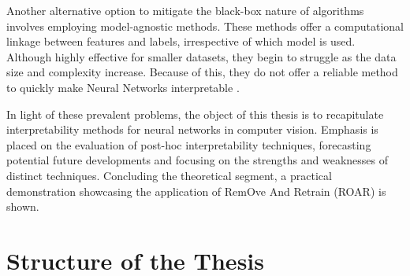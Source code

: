 Another alternative option to mitigate the black-box nature of algorithms involves employing model-agnostic methods. These methods offer a computational linkage between features and labels, irrespective of which model is used. Although highly effective for smaller datasets, they begin to struggle as the data size and complexity increase. Because of this, they do not offer a reliable method to quickly make Neural Networks interpretable \cite{molnar2022}.

In light of these prevalent problems, the object of this thesis is to recapitulate interpretability methods for neural networks in computer vision. Emphasis is placed on the evaluation of post-hoc interpretability techniques, forecasting potential future developments and focusing on the strengths and weaknesses of distinct techniques. Concluding the theoretical segment, a practical demonstration showcasing the application of RemOve And Retrain (ROAR)\cite{hooker2019benchmark} is shown. 

\section{Structure of the Thesis}

